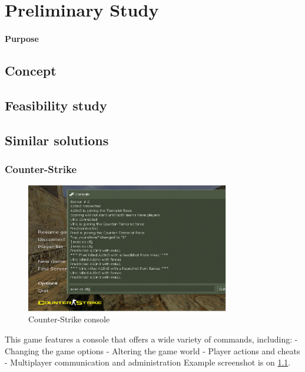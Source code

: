 \chapter{Preliminary Study}

\minitoc

\subsubsection{Purpose}

\clearpage

\section{Concept}

\section{Feasibility study}

\section{Similar solutions}

\subsection{Counter-Strike}

\begin{figure}
\centering
\includegraphics[width = 0.8\textwidth]{image/counterstrike.png}
\caption{Counter-Strike console}
\label{image-counterstrike}
\end{figure}

This game features a console that offers a wide variety of commands, including:
- Changing the game options
- Altering the game world
- Player actions and cheats
- Multiplayer communication and administration
Example screenshot is on \ref{image-counterstrike}.

